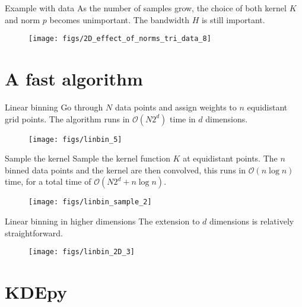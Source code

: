 \documentclass[11pt, aspectratio=149]{beamer}
\theoremstyle{plain}
\begin{document}
\begin{frame}[fragile, t]{Example with data}
	As the number of samples grow, the choice of both kernel $K$ and norm $p$ becomes unimportant. The bandwidth $H$ is still important.
	\vfill
	\begin{figure}
		\centering
		\texttt{[image: figs/2D\_effect\_of\_norms\_tri\_data\_8]}
	\end{figure}
\end{frame}


\section{A fast algorithm}


\begin{frame}[fragile, t]{Linear binning}
	Go through $N$ data points and assign weights to $n$ equidistant grid points. The algorithm runs in $\mathcal{O}(N2^d)$ time in $d$ dimensions.
	\vfill
	\begin{figure}
		\centering
		\texttt{[image: figs/linbin\_5]}
	\end{figure}
\end{frame}


\begin{frame}[fragile, t]{Sample the kernel}
	Sample the kernel function $K$ at equidistant points.
	The $n$ binned data points and the kernel are then convolved, this runs in $\mathcal{O}(n \log n)$ time, for a total time of $\mathcal{O}(N2^d + n \log n)$.
	\vfill
	\begin{figure}
		\centering
		\texttt{[image: figs/linbin\_sample\_2]}
	\end{figure}
\end{frame}


\begin{frame}[fragile, t]{Linear binning in higher dimensions}
	The extension to $d$ dimensions is relatively straightforward.
	\vfill
	\begin{figure}
		\centering
		\texttt{[image: figs/linbin\_2D\_3]}
	\end{figure}
\end{frame}


\section{KDEpy}
\end{document}
